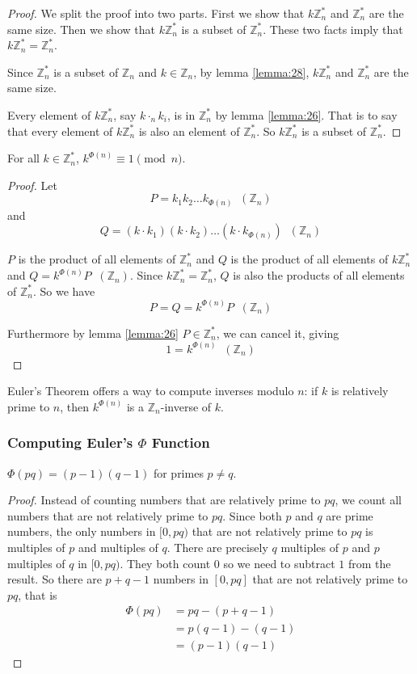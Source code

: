 \documentclass[11pt]{article}
\newcommand{\Zn}{\mathbb{Z}_n}
\newcommand{\Zns}{\mathbb{Z}^\ast_n}
\newcommand{\Dotn}{\cdot_n}
\newcommand{\Inzns}{\;\;(\Zn)}
\begin{document}
\begin{proof}
We split the proof into two parts. First we show that $k\Zns$ and $\Zns$ are the same size.
Then we show that $k\Zns$ is a subset of $\Zns$. These two facts imply that $k\Zns = \Zns$.

Since $\Zns$ is a subset of $\Zn$ and $k \in \Zn$, by lemma \ref{lemma:28}, $k\Zns$ and
$\Zns$ are the same size.

Every element of $k\Zns$, say $k \Dotn k_i$, is in $\Zns$ by lemma \ref{lemma:26}. That is
to say that every element of $k\Zns$ is also an element of $\Zns$. So $k\Zns$ is a subset of
$\Zns$.
\end{proof}

\begin{theorem}
For all $k \in \Zns$, $k^{\Phi(n)} \equiv 1 \pmod{n}$.
\end{theorem}

\begin{proof}
Let
\[
  P = k_1k_2 \dots k_{\Phi(n)} \Inzns
\]
and
\[
  Q = (k \cdot k_1)(k \cdot k_2) \dots (k \cdot k_{\Phi(n)}) \Inzns
\]

$P$ is the product of all elements of $\Zns$ and $Q$ is the product of all elements of
$k\Zns$ and $Q = k^{\Phi(n)}P \Inzns$. Since $k\Zns = \Zns$, $Q$ is also the products of all
elements of $\Zns$. So we have
\[
  P = Q = k^{\Phi(n)}P \Inzns
\]

Furthermore by lemma \ref{lemma:26} $P \in \Zns$, we can cancel it, giving
\[
  1 = k^{\Phi(n)} \Inzns
\]
\end{proof}

Euler's Theorem offers a way to compute inverses modulo $n$: if $k$ is relatively prime to
$n$, then $k^{\Phi(n)}$ is a $\Zn$-inverse of $k$.

\subsubsection{Computing Euler's $\Phi$ Function}

\begin{lemma}
$\Phi(pq) = (p-1)(q-1)$ for primes $p \neq q$.
\end{lemma}

\begin{proof}
Instead of counting numbers that are relatively prime to $pq$, we count all numbers that are
not relatively prime to $pq$. Since both $p$ and $q$ are prime numbers, the only numbers in
$[0, pq)$ that are not relatively prime to $pq$ is multiples of $p$ and multiples of $q$.
There are precisely $q$ multiples of $p$ and $p$ multiples of $q$ in $[0, pq)$. They both
count $0$ so we need to subtract $1$ from the result. So there are $p + q - 1$ numbers in
$[0, pq]$ that are not relatively prime to $pq$, that is
\begin{align*}
\Phi(pq) &= pq - (p + q - 1) \\
&=p(q-1) - (q - 1) \\
&=(p-1)(q-1)
\end{align*}
\end{proof}
\end{document}
